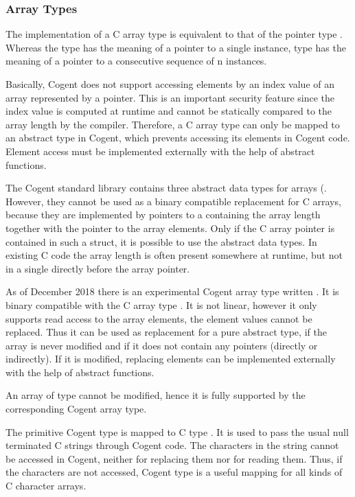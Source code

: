 \subsubsection{Array Types}

The implementation of a C array type  is equivalent to that of the pointer type . 
Whereas the type  has the meaning of a pointer to a single  instance, type 
has the meaning of a pointer to a consecutive sequence of n  instances. 

Basically, Cogent does not support accessing elements by an index value of an array represented by a pointer. 
This is an important security feature since the index value is computed at runtime and cannot be statically 
compared to the array length by the compiler. Therefore, a C array type can only be mapped to an abstract type 
in Cogent, which prevents accessing its elements in Cogent code. Element access must be implemented externally 
with the help of abstract functions.

The Cogent standard library contains three abstract data types for arrays (. 
However, they cannot be used as a binary compatible replacement for C arrays, because they are implemented by 
pointers to a  containing the array length together with the pointer to the array elements. 
Only if the C array pointer is contained in such a struct, it is possible to use the abstract data types. 
In existing C code the array length is often present somewhere at runtime, but not in a single 
directly before the array pointer.

As of December 2018 there is an experimental Cogent array type written . It is binary compatible 
with the C array type . It is not linear, however it only supports read access to the array elements, 
the element values cannot be replaced. Thus it can be used as replacement for a pure abstract type, if the array 
is never modified and if it does not contain any pointers (directly or indirectly). If it is modified, replacing
elements can be implemented externally with the help of abstract functions.

An array of type  cannot be modified, hence it is fully supported by the corresponding 
Cogent array type.

The primitive Cogent type  is mapped to C type . It is used to pass the usual 
null terminated C strings through Cogent code. The characters in the string cannot be accessed in Cogent, 
neither for replacing them nor for reading them. Thus, if the characters are not accessed, Cogent type
 is a useful mapping for all kinds of C character arrays.

